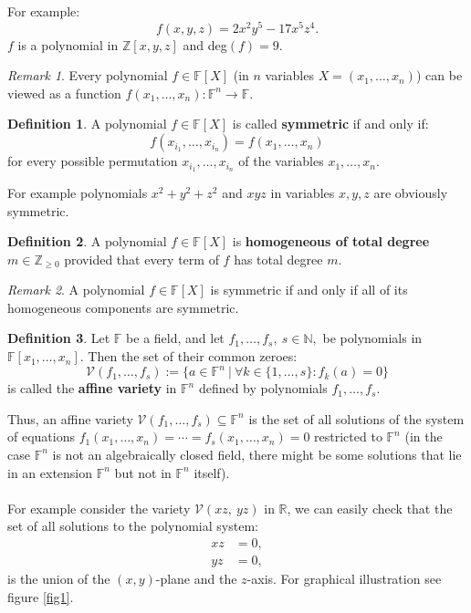 \documentclass[thesis=M,english]{FITthesis}[2012/10/20]
\theoremstyle{remark}
\newtheorem*{RM}{Remark}
\theoremstyle{definition}
\newtheorem{DF}{Definition}[section]
\begin{document}
\noindent For example:
$$
f(x,y,z) = 2x^2y^5 - 17x^5z^4.
$$
$f$ is a polynomial in $\mathbb{Z}[x,y,z]$ and deg$(f)=9.$
\begin{RM}
Every polynomial $f \in \mathbb{F}[X]$ (in $n$ variables $X = (x_1,\ldots,x_n)$) can be viewed as a function $f(x_1,\ldots,x_n) : \mathbb{F}^n \to \mathbb{F}$.
\end{RM}
\begin{DF}
A polynomial $f \in \mathbb{F}[X]$ is called \textbf{symmetric} if and only if:
$$
f(x_{i_1}, \ldots, x_{i_n}) = f(x_1, \ldots, x_n)
$$
for every possible permutation $x_{i_1}, \ldots, x_{i_n}$ of the variables $x_1, \ldots, x_n$.
\end{DF}
\noindent For example polynomials $x^2+y^2+z^2$ and $xyz$ in variables $x,y,z$ are obviously symmetric.
\begin{DF}
A polynomial $f \in \mathbb{F}[X]$ is \textbf{homogeneous of total degree} $m \in \mathbb{Z}_{\geq 0}$ provided that every term of $f$ has total degree $m$.
\end{DF}
\begin{RM}
A polynomial $f \in \mathbb{F}[X]$ is symmetric if and only if all of its homogeneous components are symmetric.
\end{RM}
\begin{DF}
Let $\mathbb{F}$ be a field, and let $f_1, \ldots, f_s,\ s \in \mathbb{N},$ be polynomials in $\mathbb{F}[x_1,\ldots, x_n].$ Then the set of their common zeroes:
$$
\mathcal{V}(f_1, \ldots, f_s) := \{a \in \mathbb{F}^n\ |\ \forall k \in \{1,\ldots,s\}: f_k(a) =  0\}
$$
is called the \textbf{affine variety} in $\mathbb{F}^n$ defined by polynomials $f_1, \ldots, f_s$.
\end{DF}
\noindent Thus, an affine variety $\mathcal{V}(f_1, \ldots, f_s) \subseteq \mathbb{F}^n$ is the set of all solutions of the system of equations $f_1(x_1,\ldots,x_n) = \cdots = f_s(x_1,\ldots,x_n) = 0$ restricted to $\mathbb{F}^n$ (in the case $\mathbb{F}^n$ is not an algebraically closed field, there might be some solutions that lie in an extension $\mathbb{F}^n$ but not in $\mathbb{F}^n$ itself).\\ \\
\noindent For example consider the variety $\mathcal{V}(xz,\ yz)$ in $\mathbb{R}$, we can easily check that the set of all solutions to the polynomial system:
\begin{align*}
xz &= 0, \\
yz& = 0,
\end{align*}
is the union of the $(x,y)$-plane and the $z$-axis. For graphical illustration see figure \ref{fig1}.
\end{document}
